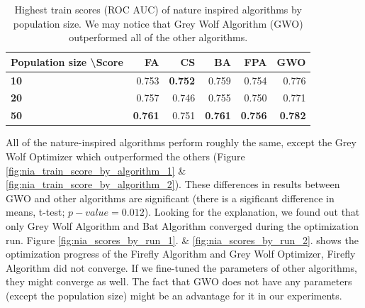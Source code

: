 \documentclass[runningheads]{llncs}
\begin{document}
\def\arraystretch{1.5}
\begin{table}
	\vspace*{0.5cm}
	\begin{center}
		\caption{Highest train scores (ROC AUC) of nature inspired algorithms by population size. We may notice that Grey Wolf Algorithm (GWO) outperformed all of the other algorithms.} \label{tab:nia_comparison}
	\end{center}
	\begin{center}
		\begin{tabular}{|l|r|r|r|r|r|}
			\hline
			\textbf{Population size \textbackslash Score} & \multicolumn{1}{r|}{\textbf{FA}} & \multicolumn{1}{r|}{\textbf{CS}} & \multicolumn{1}{r|}{\textbf{BA}} & \multicolumn{1}{r|}{\textbf{FPA}} & \multicolumn{1}{r|}{\textbf{GWO}} \\ \hline
			\textbf{10}                                             & 0.753                           & \textbf{0.752}                           & 0.759                           & 0.754                            & 0.776                             \\
			\textbf{20}                                             & 0.757                           & 0.746                           & 0.755                           & 0.750                            & 0.771                             \\
			\textbf{50}                                             & \textbf{0.761}                           & 0.751                           & \textbf{0.761}                           & \textbf{0.756}                            & \textbf{0.782}                             \\ \hline
		\end{tabular}
	\end{center}
\end{table}

All of the nature-inspired algorithms perform roughly the same, except the Grey Wolf Optimizer which outperformed the others (Figure \ref{fig:nia_train_score_by_algorithm_1} \& \ref{fig:nia_train_score_by_algorithm_2}). These differences in results between GWO and other algorithms are significant (there is a sigificant difference in means, t-test; $p-value=0.012$). Looking for the explanation, we found out that only Grey Wolf Algorithm and Bat Algorithm converged during the optimization run. Figure \ref{fig:nia_scores_by_run_1}. \& \ref{fig:nia_scores_by_run_2}. shows the optimization progress of the Firefly Algorithm and Grey Wolf Optimizer, Firefly Algorithm did not converge. If we fine-tuned the parameters of other algorithms, they might converge as well. The fact that GWO does not have any parameters (except the population size) might be an advantage for it in our experiments.
\end{document}
